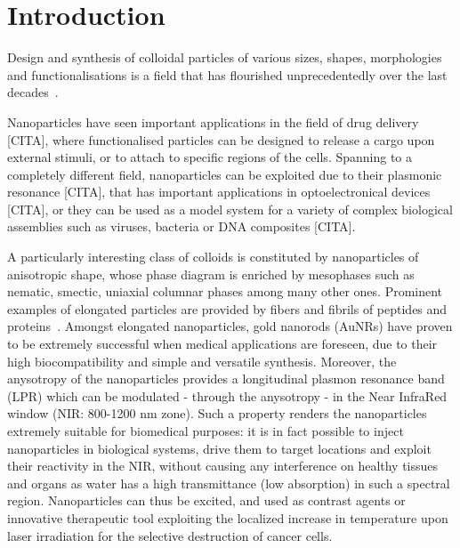 \documentclass[journal=jacsat,manuscript=article]{achemso}
\begin{document}
\section{Introduction}



Design and synthesis of colloidal particles of various sizes, shapes, morphologies and functionalisations is a field that has flourished unprecedentedly over the last decades~\cite{Hueckel2021,Sacanna2013,Manoharan2015,Glotzer2007}. 

Nanoparticles have seen  important applications in the field of drug delivery [CITA], where functionalised particles can be designed  to release a cargo upon external stimuli, or to attach to specific regions of the cells. Spanning to a completely different field, nanoparticles can be exploited due to their plasmonic resonance [CITA], that has important applications in optoelectronical devices [CITA], or they can be used as a model system  for a variety of complex biological assemblies such as viruses, bacteria or DNA composites [CITA]. 

{\color{green}A particularly interesting class of colloids is constituted by nanoparticles of anisotropic shape, whose
phase diagram is enriched by mesophases such as nematic, smectic, uniaxial columnar phases among many other ones.
Prominent examples of elongated particles are provided by fibers and fibrils of peptides and proteins~\cite{Mezzenga2018,DeMichele2019,DeMichele2021}. 
}
Amongst elongated nanoparticles, gold nanorods (AuNRs) have proven to be extremely successful when medical applications
are foreseen, due to their high  biocompatibility and simple and versatile synthesis. Moreover, the anysotropy  of the
nanoparticles provides a longitudinal plasmon resonance band (LPR) which can be modulated - through the anysotropy - in %
the Near InfraRed window (NIR: 800-1200 nm zone). Such a property renders the nanoparticles extremely suitable for
biomedical purposes: it is in fact possible to inject nanoparticles in biological systems, drive them to target
locations and exploit their reactivity in the NIR, without causing any interference on healthy tissues and organs as
water has a high transmittance (low absorption) in such a spectral region.
Nanoparticles can thus be excited, and used as contrast agents or innovative therapeutic tool exploiting the localized increase 
in temperature upon laser irradiation for the selective destruction of cancer cells.
\end{document}
